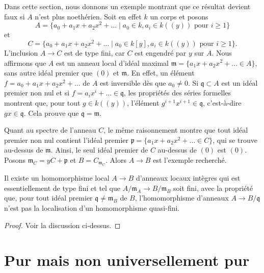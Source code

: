 \medskip\noindent
Dans cette section, nous donnons un exemple montrant que ce résultat devient faux si $A$
n'est plus noethérien. Soit en effet $k$ un corps et posons
$$
A = \{a_0 + a_1 x + a_2 x^2 + \ldots \mid a_0 \in k, a_i \in k((y))
\text{ pour }i\geq 1\}
$$
et
$$
C = \{a_0 + a_1 x + a_2 x^2 + \ldots \mid a_0 \in k[y], a_i \in k((y))
\text{ pour }i\geq 1\}.
$$
L'inclusion $A \to C$ est de type fini, car $C$ est engendré par $y$
sur $A$. Nous affirmons que $A$ est un anneau local d'idéal maximal
$\mathfrak m = \{a_1 x + a_2 x^2 + \ldots \in A\}$, sans autre idéal
premier que $(0)$ et $\mathfrak m$. En effet, un élément
$f = a_0 + a_1 x + a_2 x^2 + \ldots$ de $A$ est inversible dès que
$a_0 \not = 0$. Si $\mathfrak q \subset A$ est un idéal premier non nul
et si $f = a_i x^i + \ldots \in \mathfrak q$, les propriétés des
séries formelles montrent que, pour tout $g \in k((y))$, l'élément
$g^{i + 1} x^{i + 1} \in \mathfrak q$, c'est-à-dire $gx \in \mathfrak q$.
Cela prouve que $\mathfrak q = \mathfrak m$.

\medskip\noindent
Quant au spectre de l'anneau $C$, le même raisonnement montre
que tout idéal premier non nul contient l'idéal premier
$\mathfrak p = \{a_1 x + a_2 x^2 + \ldots \in C\}$, qui se trouve
au-dessus de $\mathfrak m$. Ainsi, le seul idéal premier de $C$ au-dessus de
$(0)$ est $(0)$. Posons $\mathfrak m_C = yC + \mathfrak p$ et
$B = C_{\mathfrak m_C}$. Alors $A \to B$ est l'exemple recherché.

\begin{lemma}
\label{lemma-topology-finite-type}
Il existe un homomorphisme local $A \to B$ d'anneaux locaux intègres qui est
essentiellement de type fini et tel que $A/\mathfrak m_A \to B/\mathfrak m_B$
soit fini, avec la propriété que, pour tout idéal premier
$\mathfrak q \not = \mathfrak m_B$ de $B$, l'homomorphisme d'anneaux
$A \to B/\mathfrak q$ n'est pas la localisation d'un homomorphisme quasi-fini.
\end{lemma}

\begin{proof}
Voir la discussion ci-dessus.
\end{proof}



\section{Pur mais non universellement pur}
\label{section-pure-not-universally}

